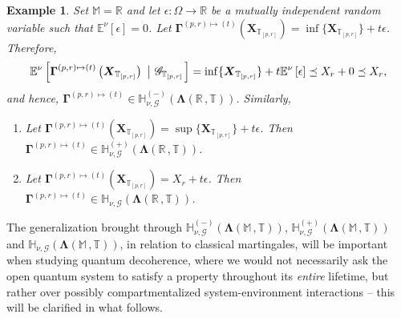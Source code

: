 \documentclass[12pt,a4paper]{article}
\newtheorem{ex}[thm]{Example}
\def\R{\mathbb{R}}
\def\M{\mathbb{M}}
\def\T{\mathbb{T}}
\def\G{\mathscr{G}}
\begin{document}
\begin{ex}
Set $\M=\R$ and let $\epsilon: \Omega \rightarrow \R$ be a mutually independent random variable such that $\mathbb{E}^{\nu}\left[ \epsilon \right] = 0$. Let $\boldsymbol{\Gamma}^{(p,r)\mapsto(t)}\left(  \boldsymbol{X}_{\T_{[p,r]}} \right) = \inf\{ \boldsymbol{X}_{\T_{[p,r]}} \} + t\epsilon$. Therefore,
\begin{align}
\mathbb{E}^{\nu}\left[\boldsymbol{\Gamma}^{(p,r)\mapsto(t)}\left(  \boldsymbol{X}_{\T_{[p,r]}} \right)  \,\, \left| \,\, \G_{\T_{[p,r]}} \right.\right] = \inf\{ \boldsymbol{X}_{\T_{[p,r]}} \} + t\mathbb{E}^{\nu}\left[\epsilon \right] \preceq X_{r} + 0 \preceq X_{r}, \notag
\end{align}
and hence, $\boldsymbol{\Gamma}^{(p,r)\mapsto(t)} \in \mathbb{H}^{(-)}_{\nu,\G}(\boldsymbol{\Lambda}(\R \,, \T))$.
Similarly,
\begin{enumerate} 
\item Let $\boldsymbol{\Gamma}^{(p,r)\mapsto(t)}\left(  \boldsymbol{X}_{\T_{[p,r]}} \right) = \sup\{ \boldsymbol{X}_{\T_{[p,r]}} \} + t\epsilon$. Then $\boldsymbol{\Gamma}^{(p,r)\mapsto(t)} \in \mathbb{H}^{(+)}_{\nu,\G}(\boldsymbol{\Lambda}(\R \,, \T))$.
\item Let $\boldsymbol{\Gamma}^{(p,r)\mapsto(t)}\left(  \boldsymbol{X}_{\T_{[p,r]}} \right) = X_{r} + t\epsilon$. Then $\boldsymbol{\Gamma}^{(p,r)\mapsto(t)} \in  \mathbb{H}_{\nu,\G}(\boldsymbol{\Lambda}(\R \,, \T))$.
\end{enumerate} 
\end{ex}

The generalization brought through $\mathbb{H}^{(-)}_{\nu,\G}(\boldsymbol{\Lambda}(\mathbb M \,, \T))$, $\mathbb{H}^{(+)}_{\nu,\G}(\boldsymbol{\Lambda}(\mathbb M \,, \T))$ and $\mathbb{H}_{\nu,\G}(\boldsymbol{\Lambda}(\mathbb M \,, \T))$, in relation to classical martingales, will be important when studying quantum decoherence, where we would not necessarily ask the open quantum system to satisfy a property throughout its \emph{entire} lifetime, but rather over possibly compartmentalized system-environment interactions -- this will be clarified in what follows.
\end{document}
